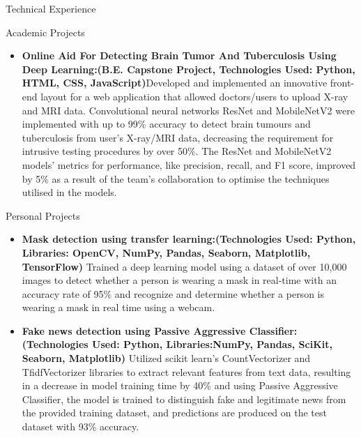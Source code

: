 \documentclass[]{mcdowellcv}
\begin{document}
\begin{cvsection}{Technical Experience}
\begin{cvsubsection}{Academic Projects}{}{}
\begin{itemize}
				\item  \textbf{Online Aid For Detecting Brain Tumor And Tuberculosis Using Deep Learning:\newline(B.E. Capstone Project, Technologies Used: Python, HTML, CSS, JavaScript)}\newline Developed and implemented an innovative front-end layout for a web application that allowed doctors/users to upload X-ray and MRI data. Convolutional neural networks ResNet and MobileNetV2 were implemented with up to 99\% accuracy to detect brain tumours and tuberculosis from user's X-ray/MRI data, decreasing the requirement for intrusive testing procedures by over 50\%. The ResNet and MobileNetV2 models' metrics for performance, like precision, recall, and F1 score, improved by 5\% as a result of the team's collaboration to optimise the techniques utilised in the models.
			\end{itemize}
		\end{cvsubsection}
		\begin{cvsubsection}{Personal Projects}{}{}
			\begin{itemize}
				\item  \textbf{Mask detection using transfer learning:\newline (Technologies Used: Python, Libraries: OpenCV, NumPy, Pandas, Seaborn, Matplotlib, TensorFlow)} Trained a deep learning model using a dataset of over 10,000 images to detect whether a person is wearing a mask in real-time with an accuracy rate of 95\% and recognize and determine whether a person is wearing a mask in real time using a webcam.
                \item  \textbf{Fake news detection using Passive Aggressive Classifier:\newline(Technologies Used: Python, Libraries:NumPy, Pandas, SciKit, Seaborn, Matplotlib)} Utilized scikit learn's CountVectorizer and TfidfVectorizer libraries to extract relevant features from text data, resulting in a decrease in model training time by 40\% and using Passive Aggressive Classifier, the model is trained to distinguish fake and legitimate news from the provided training dataset, and predictions are produced on the test dataset with 93\% accuracy.
			\end{itemize}
		\end{cvsubsection}
	\end{cvsection}
	
\end{document}

